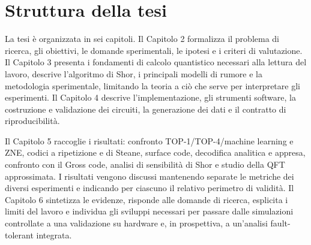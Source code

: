 \section{Struttura della tesi}\label{sec:finale_1_3}

La tesi è organizzata in sei capitoli. Il Capitolo 2 formalizza il problema di ricerca, gli obiettivi, le domande sperimentali, le ipotesi e i criteri di valutazione. Il Capitolo 3 presenta i fondamenti di calcolo quantistico necessari alla lettura del lavoro, descrive l'algoritmo di Shor, i principali modelli di rumore e la metodologia sperimentale, limitando la teoria a ciò che serve per interpretare gli esperimenti. Il Capitolo 4 descrive l'implementazione, gli strumenti software, la costruzione e validazione dei circuiti, la generazione dei dati e il contratto di riproducibilità.

Il Capitolo 5 raccoglie i risultati: confronto TOP-1/TOP-4/machine learning e ZNE, codici a ripetizione e di Steane, surface code, decodifica analitica e appresa, confronto con il Gross code, analisi di sensibilità di Shor e studio della QFT approssimata. I risultati vengono discussi mantenendo separate le metriche dei diversi esperimenti e indicando per ciascuno il relativo perimetro di validità. Il Capitolo 6 sintetizza le evidenze, risponde alle domande di ricerca, esplicita i limiti del lavoro e individua gli sviluppi necessari per passare dalle simulazioni controllate a una validazione su hardware e, in prospettiva, a un'analisi fault-tolerant integrata.
